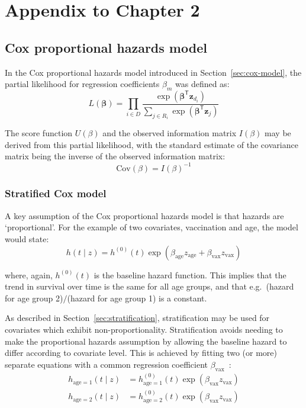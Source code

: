 
\chapter{Appendix to Chapter 2}\label{appx:methods}

\graphicspath{{01_Introduction/Figs/}}

\section{Cox proportional hazards model}

In the Cox proportional hazards model introduced in Section~\ref{sec:cox-model}, the partial likelihood for regression coefficients $\beta_m$ was defined as:
%
\[
    L(\bm{\beta}) = \prod_{i \in D}\frac{\exp(\bm{\beta}^\mathsf{T}\bm{z}_{d_i})}{\sum_{j \in R_i}\exp(\bm{\beta}^\mathsf{T}\bm{z}_j)}
\]

The score function $U(\beta)$ and the observed information matrix $I(\beta)$ may be derived from this partial likelihood, with the standard estimate of the covariance matrix being the inverse of the observed information matrix:
%
\[
    \text{Cov}(\beta) = {I(\beta)}^{-1}
\]

\subsection{Stratified Cox model}

A key assumption of the Cox proportional hazards model is that hazards are `proportional'. For the example of two covariates, vaccination and age, the model would state:
%
\[
    h(t \mid z) = h^{(0)}(t)\exp(\beta_{\text{age}}z_{\text{age}} + \beta_{\text{vax}}z_{\text{vax}})
\]

where, again, $h^{(0)}(t)$ is the baseline hazard function. This implies that the trend in survival over time is the same for all age groups, and that e.g.\ (hazard for age group 2)$/$(hazard for age group 1) is a constant.

As described in Section~\ref{sec:stratification}, stratification may be used for covariates which exhibit non-proportionality. Stratification avoids needing to make the proportional hazards assumption by allowing the baseline hazard to differ according to covariate level. This is achieved by fitting two (or more) separate equations with a common regression coefficient $\beta_{\text{vax}}$~\parencite{Collett2023-bg}:
%
\begin{align*}
    h_{\text{age} = 1}(t \mid z) & = h^{(0)}_{\text{age} = 1}(t)\exp(\beta_{\text{vax}}z_{\text{vax}}) \\
    h_{\text{age} = 2}(t \mid z) & = h^{(0)}_{\text{age} = 2}(t)\exp(\beta_{\text{vax}}z_{\text{vax}})
\end{align*}


